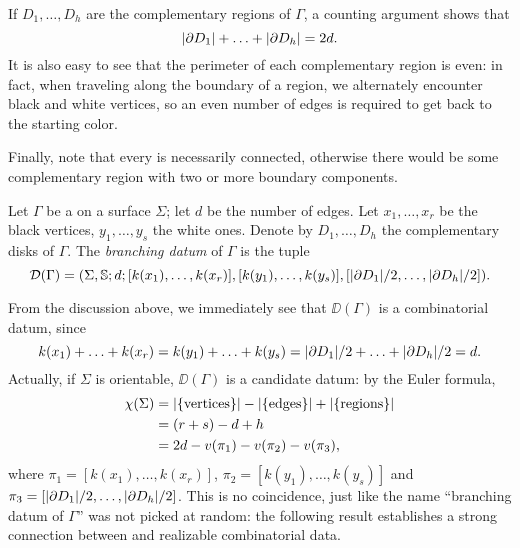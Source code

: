 If $D_1,\ldots,D_h$ are the complementary regions of $\Gamma$, a counting argument shows that
\[
\lvert \partial D_1\rvert+\ldots+\lvert \partial D_h\rvert=2d.
\]
It is also easy to see that the perimeter of each complementary region is even: in fact, when traveling along the boundary of a region, we alternately encounter black and white vertices, so an even number of edges is required to get back to the starting color.

Finally, note that every \dessin{} is necessarily connected, otherwise there would be some complementary region with two or more boundary components.

\begin{definition}
Let $\Gamma$ be a \dessin{} on a surface $\Sigma$; let $d$ be the number of edges. Let $x_1,\ldots,x_r$ be the black vertices, $y_1,\ldots,y_s$ the white ones. Denote by $D_1,\ldots,D_h$ the complementary disks of $\Gamma$. The \emph{branching datum} of $\Gamma$ is the tuple
\[
\mathcal{D}(\Gamma)=(\Sigma,\mathbb{S}{};d;[k(x_1),\ldots,k(x_r)],[k(y_1),\ldots,k(y_s)],[\lvert \partial D_1\rvert/2,\ldots,\lvert \partial D_h\rvert/2]).
\]
\end{definition}

From the discussion above, we immediately see that $\DD(\Gamma)$ is a combinatorial datum, since
\[
k(x_1)+\ldots+k(x_r)=k(y_1)+\ldots+k(y_s)=\lvert \partial D_1\rvert/2+\ldots+\lvert \partial D_h\rvert/2=d.
\]
Actually, if $\Sigma$ is orientable, $\DD(\Gamma)$ is a candidate datum: by the Euler formula,
\begin{align*}
\chi(\Sigma)&=\lvert \{\text{vertices}\}\rvert-\lvert \{\text{edges}\}\rvert+\lvert \{\text{regions}\}\rvert\\
&=(r+s)-d+h\\
&=2d-v(\pi_1)-v(\pi_2)-v(\pi_3),
\end{align*}
where $\pi_1=[k(x_1),\ldots,k(x_r)]$, $\pi_2=[k(y_1),\ldots,k(y_s)]$ and $\pi_3=[\lvert \partial D_1\rvert/2,\ldots,\lvert \partial D_h\rvert/2]$. This is no coincidence, just like the name ``branching datum of $\Gamma$'' was not picked at random: the following result establishes a strong connection between \dessins{} and realizable combinatorial data.

